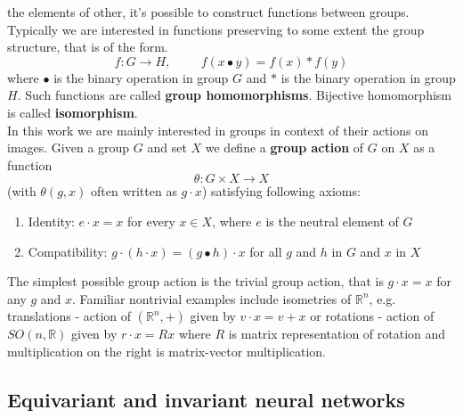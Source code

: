         the elements of other, it's possible to construct functions between groups.
        Typically we are interested in functions preserving to some extent the group structure,
        that is of the form.
        \begin{equation}
            f:G \to H, \hspace{1cm} f(x\bullet y) = f(x) \ast f(y)
        \end{equation}
        where $\bullet$ is the binary operation in group $G$ and $\ast$ is the binary operation
        in group $H$. Such functions are called \textbf{group homomorphisms}.
        Bijective homomorphism is called \textbf{isomorphism}.\\

        In this work we are mainly interested in groups in context of their actions
        on images. Given a group $G$ and set $X$ we define a
        \textbf{group action} of $G$ on $X$ as a function
        \begin{equation}
            \theta: G \times X \to X
        \end{equation}
        (with $\theta(g,x)$ often written as $g\cdot x$) satisfying following axioms:
        \begin{enumerate}
            \item Identity: $e \cdot x = x$ for every $x \in X$, where $e$ is the neutral element
                    of $G$
            \item Compatibility: $g \cdot \left(h \cdot x\right) =
                \left(g \bullet h \right) \cdot x$ for all $g$ and $h$ in $G$ and $x$ in $X$
        \end{enumerate}
        The simplest possible group action is the trivial group action, that is
        $g\cdot x = x$ for any $g$ and $x$. Familiar nontrivial examples include isometries
        of $\mathbb{R}^n$, e.g.
        translations - action of $\left(\mathbb{R}^n,+\right)$ given by $v \cdot x = v+x$ or
        rotations - action of $SO(n,\mathbb{R})$ given by $r \cdot x = Rx$ where
        $R$ is matrix representation of rotation and
        multiplication on the right is matrix-vector multiplication.








\subsection{Equivariant and invariant neural networks}
